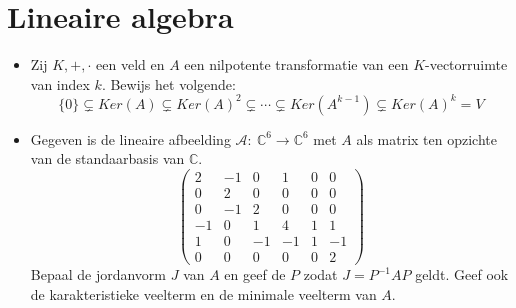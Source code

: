 \documentclass[main.tex]{subfiles}
\begin{document}
 \section{Lineaire algebra}
 \label{sec:lineaire-algebra}

 \begin{itemize}
 \item Zij $K,+,\cdot$ een veld en $A$ een nilpotente transformatie van een $K$-vectorruimte van index $k$.
   Bewijs het volgende:
   \[ \{0\} \subsetneq Ker(A) \subsetneq Ker(A)^{2} \subsetneq \dotsb \subsetneq Ker(A^{k-1}) \subsetneq Ker(A)^{k} = V \]
 \item Gegeven is de lineaire afbeelding $\mathcal{A}:\ \mathbb{C}^{6} \rightarrow \mathbb{C}^{6}$ met $A$ als matrix ten opzichte van de standaarbasis van $\mathbb{C}$.
   \[
   \begin{pmatrix}
     2 & -1 & 0 & 1 & 0 & 0\\
     0 & 2 & 0 & 0 & 0 & 0\\
     0 & -1 & 2 & 0 & 0 & 0\\
     -1 & 0 & 1 & 4 & 1 & 1\\
     1 & 0 & -1 & -1 & 1 & -1\\
     0 & 0 & 0 & 0 & 0 & 2
   \end{pmatrix}
   \]
   Bepaal de jordanvorm $J$ van $A$ en geef de $P$ zodat $J=P^{-1}AP$ geldt.
   Geef ook de karakteristieke veelterm en de minimale veelterm van $A$.


\end{itemize}
\end{document}

